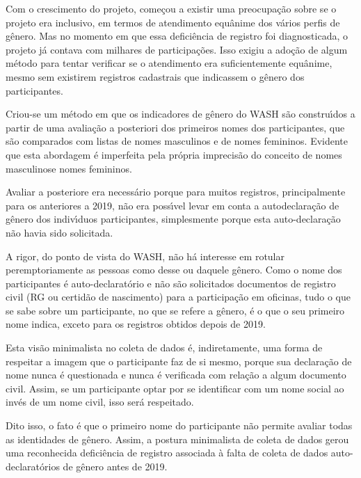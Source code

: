 \documentclass[
12pt,		%
openright,	%
twoside,  %
a4paper,			%
chapter=TITLE,		%
english,			%
french,				%
spanish,			%
brazil				%
]{USPSC-classe/USPSC}
\begin{document}
Com o crescimento do projeto, come\c{c}ou a existir uma preocupa\c{c}\~ao sobre se o projeto era inclusivo, em termos de atendimento equ\^anime dos v\'arios perfis de g\^enero. Mas no momento em que essa defici\^encia de registro foi diagnosticada, o projeto j\'a contava com milhares de participa\c{c}\~oes. Isso exigiu a ado\c{c}\~ao de algum m\'etodo para tentar verificar se o atendimento era suficientemente equ\^anime, mesmo sem existirem registros cadastrais que indicassem o g\^enero dos participantes.




Criou-se um m\'etodo em que os indicadores de g\^enero do WASH s\~ao constru\'{\i}dos a partir de uma avalia\c{c}\~ao a posteriori dos primeiros nomes dos participantes, que s\~ao comparados com listas de nomes masculinos e de nomes femininos. Evidente que esta abordagem \'e imperfeita pela pr\'opria imprecis\~ao do conceito de \textquotedbl nomes masculinos\textquotedbl  e \textquotedbl nomes femininos\textquotedbl .




Avaliar a posteriore era necess\'ario porque para muitos registros, principalmente para os anteriores a 2019, n\~ao era poss\'{\i}vel levar em conta a autodeclara\c{c}\~ao de g\^enero dos indiv\'{\i}duos participantes, simplesmente porque esta auto-declara\c{c}\~ao n\~ao havia sido solicitada.




A rigor, do ponto de vista do WASH, n\~ao h\'a interesse em rotular peremptoriamente as pessoas como desse ou daquele g\^enero. Como o nome dos participantes \'e auto-declarat\'orio e n\~ao s\~ao solicitados documentos de registro civil (RG ou certid\~ao de nascimento) para a participa\c{c}\~ao em oficinas, tudo o que se sabe sobre um participante, no que se refere a g\^enero, \'e o que o seu primeiro nome indica, exceto para os registros obtidos depois de 2019.




Esta vis\~ao minimalista no coleta de dados \'e, indiretamente, uma forma de respeitar a imagem que o participante faz de si mesmo, porque sua declara\c{c}\~ao de nome nunca \'e questionada e nunca \'e verificada com rela\c{c}\~ao a algum documento civil. Assim, se um participante optar por se identificar com um nome social ao inv\'es de um nome civil, isso ser\'a respeitado.




Dito isso, o fato \'e que o primeiro nome do participante n\~ao permite avaliar todas as identidades de g\^enero. Assim, a postura minimalista de coleta de dados gerou uma reconhecida defici\^encia de registro associada \`a falta de coleta de dados auto-declarat\'orios de g\^enero antes de 2019.
\end{document}
